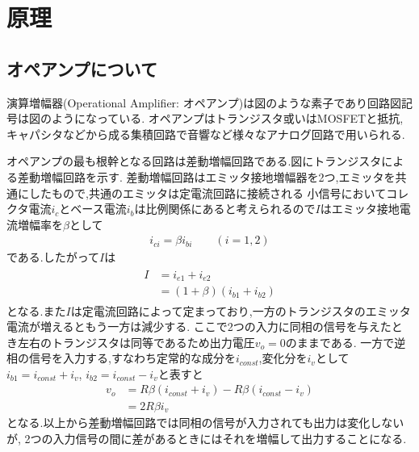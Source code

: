 \section{原理}
\subsection{オペアンプについて}
演算増幅器(Operational Amplifier: オペアンプ)は図のような素子であり回路図記号は図のようになっている.
オペアンプはトランジスタ或いはMOSFETと抵抗,キャパシタなどから成る集積回路で音響など様々なアナログ回路で用いられる.

オペアンプの最も根幹となる回路は差動増幅回路である.\cite{densikairo}図にトランジスタによる差動増幅回路を示す.
差動増幅回路はエミッタ接地増幅器を2つ,エミッタを共通にしたもので,共通のエミッタは定電流回路に接続される
小信号においてコレクタ電流$i_c$とベース電流$i_b$は比例関係にあると考えられるので$I$はエミッタ接地電流増幅率を$\beta$として
\begin{align}
  i_{ci}=\beta i_{bi}\qquad(i=1,2)
\end{align}
である.したがって$I$は
\begin{align}
  \begin{split}
    I&=i_{e1}+i_{e2}\\
    &=(1+\beta)(i_{b1}+i_{b2})
  \end{split}
\end{align}
となる.また$I$は定電流回路によって定まっており,一方のトランジスタのエミッタ電流が増えるともう一方は減少する.
ここで2つの入力に同相の信号を与えたとき左右のトランジスタは同等であるため出力電圧$v_o=0$のままである.
一方で逆相の信号を入力する,すなわち定常的な成分を$i_{const}$,変化分を$i_v$として$i_{b1}=i_{const}+i_v$,
$i_{b2}=i_{const}-i_v$と表すと
\begin{align}
  v_o&=R\beta(i_{const}+i_v)-R\beta(i_{const}-i_v)\\
  &=2R\beta i_v
\end{align}
となる.以上から差動増幅回路では同相の信号が入力されても出力は変化しないが,
2つの入力信号の間に差があるときにはそれを増幅して出力することになる.

